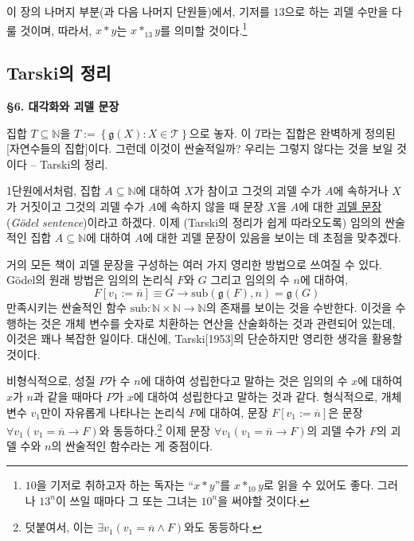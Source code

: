 \documentclass[12pt]{paper}
\newcommand{\gnum}
{ \mathfrak{g}
}
\begin{document}
  이 장의 나머지 부분(과 다음 나머지 단원들)에서,
  기저를 $13$으로 하는 괴델 수만을 다룰 것이며,
  따라서, $x * y$는 $x *_{13} y$를 의미할 것이다.\footnote
  {
    $10$을 기저로 취하고자 하는 독자는 ``$x * y$''를 $x *_{10} y$로 읽을 수 있어도 좋다.
    그러나 $13^{n}$이 쓰일 때마다 그 또는 그녀는 $10^{n}$을 써야할 것이다.
  }

  \subsection{Tarski의 정리}
  \hspace{12pt}

  \noindent \textbf{\S 6. 대각화와 괴델 문장}

  집합 $T \subseteq \mathbb{N}$을 $T := \left\{ \gnum \left( X \right) : X \in \mathcal{T} \right\}$으로 놓자.
  이 $T$라는 집합은 완벽하게 정의된 [자연수들의 집합]이다.
  그런데 이것이 싼술적일까?
  우리는 그렇지 않다는 것을 보일 것이다 -- Tarski의 정리.

  1단원에서처럼, 집합 $A \subseteq \mathbb{N}$에 대하여
  $X$가 참이고 그것의 괴델 수가 $A$에 속하거나 $X$가 거짓이고 그것의 괴델 수가 $A$에 속하지 않을 때
  문장 $X$을 $A$에 대한 \underline{괴델 문장}(\textit{G\"odel sentence})이라고 하겠다.
  이제 (Tarski의 정리가 쉽게 따라오도록)
  임의의 싼술적인 집합 $A \subseteq \mathbb{N}$에 대하여
  $A$에 대한 괴델 문장이 있음을 보이는 데 초점을 맞추겠다.

  거의 모든 책이 괴델 문장을 구성하는 여러 가지 영리한 방법으로 쓰여질 수 있다.
  G\"odel의 원래 방법은 임의의 논리식 $F$와 $G$ 그리고 임의의 수 $n$에 대하여,
  $$F \left[ v_1 := \overline{n} \right] \equiv G \rightarrow \mathrm{sub} \left( \gnum \left( F \right) , n \right) = \gnum \left( G \right)$$
  만족시키는 싼술적인 함수 $\mathrm{sub} : \mathbb{N} \times \mathbb{N} \to \mathbb{N}$의 존재를 보이는 것을 수반한다.
  이것을 수행하는 것은 개체 변수를 숫자로 치환하는 연산을 산술화하는 것과 관련되어 있는데,
  이것은 꽤나 복잡한 일이다.
  대신에, Tarski[1953]의 단순하지만 영리한 생각을 활용할 것이다.

  비형식적으로, 성질 $P$가 수 $n$에 대하여 성립한다고 말하는 것은
  임의의 수 $x$에 대하여 $x$가 $n$과 같을 때마다 $P$가 $x$에 대하여 성립한다고 말하는 것과 같다.
  형식적으로, 개체 변수 $v_1$만이 자유롭게 나타나는 논리식 $F$에 대하여,
  문장 $F \left[ v_1 := \overline{n} \right]$은 문장 $\forall v_1 \left( v_1 = \overline{n} \rightarrow F \right)$와 동등하다.\footnote
  {
    덧붙여서, 이는 $\exists v_1 \left( v_1 = \overline{n} \land F \right)$와도 동등하다.
  }
  이제 문장 $\forall v_1 \left( v_1 = \overline{n} \rightarrow F \right)$의 괴델 수가 $F$의 괴델 수와 $n$의 싼술적인 함수라는 게 중점이다.
\end{document}
